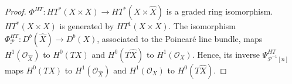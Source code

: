 \documentclass[12pt]{amsart}
\newcommand{\hide}[1]{}
\numberwithin{equation}{subsection}
\theoremstyle{plain}
\theoremstyle{definition}
\renewcommand{\P}{{\mathcal P}}
\newcommand{\StructureSheaf}[1]{{\mathcal O}_{#1}}
\begin{document}
\begin{proof}
$\Phi^{HT}:HT^*(X\times X)\rightarrow HT^*(X\times \hat{X})$ is a graded ring isomorphism.
$HT^*(X\times X)$ is generated by $HT^1(X\times X)$.
The isomorphism $\Phi^{HT}_{\P}:D^b(\hat{X})\rightarrow D^b(X)$, associated to the Poincar\'{e} line bundle, maps 
$H^1(\StructureSheaf{\hat{X}})$ to $H^0(TX)$  and $H^0(T\hat{X})$ to $H^1(\StructureSheaf{X})$. Hence, its inverse $\Psi^{HT}_{\P^{-1}[n]}$
maps $H^0(TX)$ to $H^1(\StructureSheaf{\hat{X}})$ and $H^1(\StructureSheaf{X})$ to $H^0(T\hat{X})$. 
\hide{
 It follows that $(1\boxtimes \Psi_{\P^{-1}[n]})^{HT}:HT^2(X\times X)\rightarrow HT^2(X\times\hat{X})$ maps 
$\pi_1^*H^0(TX)\otimes \pi_2^*H^1(\StructureSheaf{X})$ to the subspace $\pi_1^*H^0(TX)\otimes \pi_2^*H^0(T\hat{X}))$
of $H^0(\wedge^2T(X\times\hat{X}))$ and it maps the subspace 
$\pi_1^*H^0(TX)\otimes \pi_2^*H^0(TX)$ of $H^0(\wedge^2T(X\times X))$
to the subspace $\pi_1^*H^0(TX)\otimes \pi_2^*H^1(\StructureSheaf{X})$ 
of $H^1(T(X\times\hat{X}))$ of the commutative first order deformations.
}


\end{proof}
\end{document}
